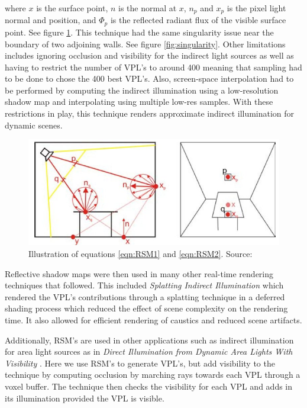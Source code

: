where $x$ is the surface point, $n$ is the normal at $x$, $n_{p}$ and $x_{p}$ is the pixel light normal and position, and $\Phi_{p}$ is the reflected radiant flux of the visible surface point.  See figure \ref{fig:RSMcalc}.  This technique had the same singularity issue near the boundary of two adjoining walls.  See figure \ref{fig:singularity}.  Other limitations includes ignoring occlusion and visibility for the indirect light sources as well as having to restrict the number of VPL's to around 400 meaning that sampling had to be done to chose the 400 best VPL's.  Also, screen-space interpolation had to be performed by computing the indirect illumination using a low-resolution shadow map and interpolating using multiple low-res samples.  With these restrictions in play, this technique renders approximate indirect illumination for dynamic scenes.  

\begin{figure}[h!]
  \centering
    \includegraphics[width=1.0\textwidth]{RSMcalc.jpg}
  \caption{Illustration of equations \ref{eqn:RSM1} and \ref{eqn:RSM2}. Source: \protect\cite{Dachsbacher2005}}
	\label{fig:RSMcalc}
\end{figure}

Reflective shadow maps were then used in many other real-time rendering techniques that followed.  This included \textit{Splatting Indirect Illumination} \cite{Dachsbacher2006} which rendered the VPL's contributions through a splatting technique in a deferred shading process which reduced the effect of scene complexity on the rendering time.  It also allowed for efficient rendering of caustics and reduced scene artifacts.

Additionally, RSM's are used in other applications such as indirect illumination for area light sources as in \textit{Direct Illumination from Dynamic Area Lights With Visibility} \cite{Nichols2010}.  Here we use RSM's to generate VPL's, but add visibility to the technique by computing occlusion by marching rays towards each VPL through a voxel buffer.  The technique then checks the visibility for each VPL and adds in its illumination provided the VPL is visible.

